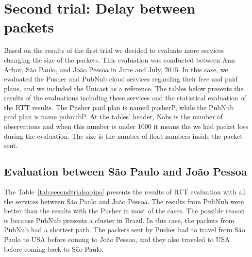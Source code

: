 \section{Second trial: Delay between packets}

Based on the results of the first trial we decided to evaluate more services changing the size of the packets.
This evaluation was conducted between Ann Arbor, São Paulo, and João Pessoa in June and July, 2015.
In this case, we evaluated the Pusher and PubNub cloud services regarding their free and paid plans, and we included the Unicast as a reference.
The tables below presents the results of the evaluations including these services and the statistical evaluation of the RTT results.
The Pusher paid plan is named pusherP, while the PubNub paid plan is name pubnubP.
At the tables' header, Nobs is the number of observations and when this number is under 1000 it means the we had packet loss during the evaluation.
The size is the number of float numbers inside the packet sent.


\subsection*{Evaluation between São Paulo and João Pessoa} 

The Table~\ref{tab:secondtrialsaojpa} presents the results of RTT evaluation with all the services between São Paulo and João Pessoa.
The results from PubNub were better than the results with the Pusher in most of the cases.
The possible reason is because PubNub presents a cluster in Brazil.
In this case, the packets from PubNub had a shortest path.
The packets sent by Pusher had to travel from São Paulo to USA before coming to João Pessoa, and they also traveled to USA before coming back to São Paulo.


